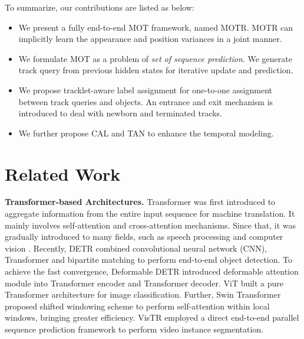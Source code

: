 \documentclass[runningheads]{llncs}
\begin{document}
To summarize, our contributions are listed as below:
\begin{itemize}
  \item We present a fully end-to-end MOT framework, named MOTR. MOTR can implicitly learn the appearance and position variances in a joint manner.
  \item We formulate MOT as a problem of \emph{set of sequence prediction}. We generate track query from previous hidden states for iterative update and prediction.
  \item We propose tracklet-aware label assignment for one-to-one assignment between track queries and objects. An entrance and exit mechanism is introduced to deal with newborn and terminated tracks.
  \item We further propose CAL and TAN to enhance the temporal modeling.
\end{itemize}


\section{Related Work}

\noindent \textbf{Transformer-based Architectures.}
Transformer \cite{vaswani2017attention} was first introduced to aggregate information from the entire input sequence for machine translation. It mainly involves self-attention
and cross-attention mechanisms. Since that, it was gradually introduced to many fields, such as speech processing \cite{li2019neuralTransformer,chang2020speechTransformer} and computer vision \cite{wang2018nonlocal,camgoz2020signTransformer}. Recently, DETR \cite{carion2020detr} combined convolutional neural network (CNN), Transformer and bipartite matching to perform end-to-end object detection.  To achieve the fast convergence, Deformable DETR \cite{zhu2020deformdetr} introduced deformable attention module into Transformer encoder and Transformer decoder. ViT \cite{anonymous2021an} built a pure Transformer architecture for image classification.
Further, Swin Transformer \cite{liu2021swin} proposed shifted windowing scheme to perform self-attention within local windows, bringing greater efficiency. VisTR \cite{vistr2021} employed a direct end-to-end parallel sequence prediction framework to perform video instance segmentation.
\end{document}
